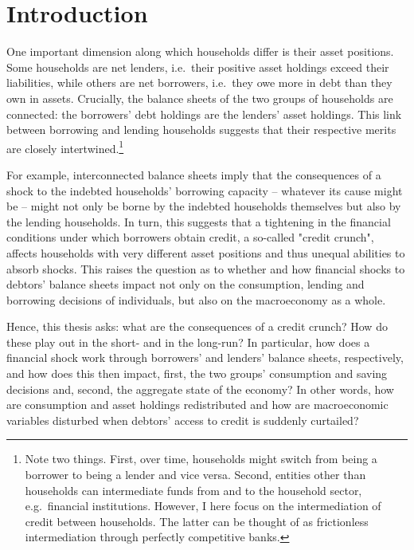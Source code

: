 \documentclass[12pt]{article} %
\numberwithin{equation}{section} %
\numberwithin{figure}{section}
\numberwithin{table}{section}
\begin{document}
\section{Introduction}
\label{sec:introduction}


One important dimension along which households differ is their asset positions. Some households are net lenders, i.e.~their positive asset holdings exceed their liabilities, while others are net borrowers, i.e.~they owe more in debt than they own in assets. Crucially, the balance sheets of the two groups of households are connected: the borrowers' debt holdings are the lenders' asset holdings. This link between borrowing and lending households suggests that their respective merits are closely intertwined.\footnote{Note two things. First, over time, households might switch from being a borrower to being a lender and vice versa. Second, entities other than households can intermediate funds from and to the household sector, e.g.~financial institutions. However, I here focus on the intermediation of credit between households. The latter can be thought of as frictionless intermediation through perfectly competitive banks.} 

For example, interconnected balance sheets imply that the consequences of a shock to the indebted households' borrowing capacity -- whatever its cause might be -- might not only be borne by the indebted households themselves but also by the lending households. In turn, this suggests that a tightening in the financial conditions under which borrowers obtain credit, a so-called "credit crunch", affects households with very different asset positions and thus unequal abilities to absorb shocks. This raises the question as to whether and how financial shocks to debtors' balance sheets impact not only on the consumption, lending and borrowing decisions of individuals, but also on the macroeconomy as a whole. 

Hence, this thesis asks: what are the consequences of a credit crunch? How do these play out in the short- and in the long-run? In particular, how does a financial shock work through borrowers' and lenders' balance sheets, respectively, and how does this then impact, first, the two groups' consumption and saving decisions and, second, the aggregate state of the economy? In other words, how are consumption and asset holdings redistributed and how are macroeconomic variables disturbed when debtors' access to credit is suddenly curtailed?
\end{document}
